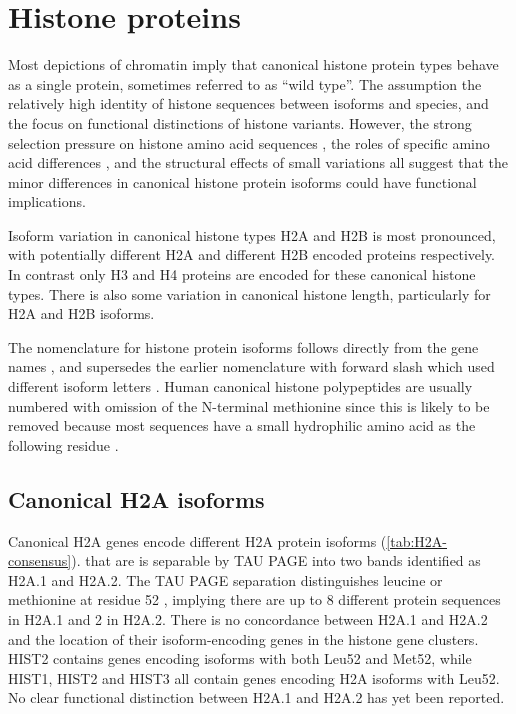 \section{Histone proteins}
	Most depictions of chromatin imply that 
	canonical histone protein types behave as a single protein, 
	sometimes referred to as ``wild type''. 
	The assumption the relatively high identity of histone sequences between isoforms and species, 
	and the focus on functional distinctions of histone variants. 
	However, the strong selection pressure on histone amino acid sequences \citep{birth-death-review},
	the roles of specific amino acid differences \citep{MazeAllis2014}, 
	and the structural effects of small variations \citep{KurumizakaCOSB2013} 
	all suggest that the minor differences in canonical histone protein isoforms 
	could have functional implications.
	
	Isoform variation in canonical histone types H2A and H2B is most pronounced, 
	with potentially \HTwoAUniqueProteins{} different H2A 
	and \HTwoBUniqueProteins{} different H2B encoded proteins respectively. 
	In contrast only \HThreeUniqueProteins{} H3 and \HFourUniqueProteins{} H4 proteins 
	are encoded for these canonical histone types. 
	There is also some variation in canonical histone length, particularly for H2A and H2B isoforms.

	The nomenclature for histone protein isoforms follows directly from the gene names \citep{Marzluff02}, 
	and supersedes the earlier nomenclature with forward slash which used different isoform letters 
	\citep{AlbigGenomics1997,AlbigHumangen1997}.
	Human canonical histone polypeptides are usually numbered 
	with omission of the N-terminal methionine 
	since this is likely to be removed because most sequences have 
	a small hydrophilic amino acid as the following residue \citep{XiaoPeiBiochem2010}.
\subsection{Canonical H2A isoforms}
	Canonical H2A genes encode \HTwoAUniqueProteins{} different H2A protein isoforms (\ref{tab:H2A-consensus}).
	that are is separable by TAU PAGE into two bands identified as H2A.1 and H2A.2. 
	The TAU PAGE separation distinguishes leucine or methionine at residue 52 \citep{FranklinZweidler1977,Zweidler1977}, 
	implying there are up to 8 different protein sequences in H2A.1 and 2 in H2A.2. 
	There is no concordance between H2A.1 and H2A.2 
	and the location of their isoform-encoding genes in the histone gene clusters. 
	HIST2 contains genes encoding isoforms with both Leu52 and Met52, 
	while HIST1, HIST2 and HIST3 all contain genes encoding H2A isoforms with Leu52. 
	No clear functional distinction between H2A.1 and H2A.2 has yet been reported.

